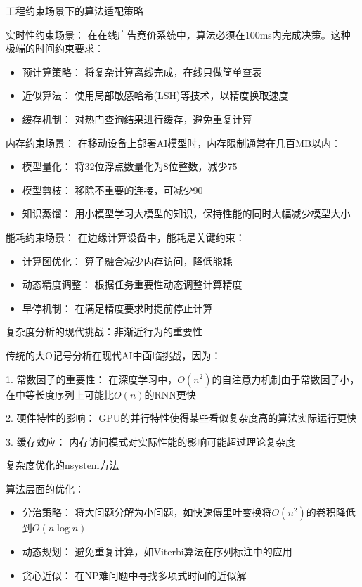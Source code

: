 工程约束场景下的算法适配策略

实时性约束场景：
在在线广告竞价系统中，算法必须在100ms内完成决策。这种极端的时间约束要求：

\begin{itemize}
\item 预计算策略： 将复杂计算离线完成，在线只做简单查表
\item 近似算法： 使用局部敏感哈希(LSH)等技术，以精度换取速度
\item 缓存机制： 对热门查询结果进行缓存，避免重复计算
\end{itemize}

内存约束场景：
在移动设备上部署AI模型时，内存限制通常在几百MB以内：

\begin{itemize}
\item 模型量化： 将32位浮点数量化为8位整数，减少75%
\item 模型剪枝： 移除不重要的连接，可减少90%
\item 知识蒸馏： 用小模型学习大模型的知识，保持性能的同时大幅减少模型大小
\end{itemize}

能耗约束场景：
在边缘计算设备中，能耗是关键约束：

\begin{itemize}
\item 计算图优化： 算子融合减少内存访问，降低能耗
\item 动态精度调整： 根据任务重要性动态调整计算精度
\item 早停机制： 在满足精度要求时提前停止计算
\end{itemize}

复杂度分析的现代挑战：非渐近行为的重要性

传统的大O记号分析在现代AI中面临挑战，因为：

1. 常数因子的重要性： 在深度学习中，$O(n^2)$的自注意力机制由于常数因子小，在中等长度序列上可能比$O(n)$的RNN更快

2. 硬件特性的影响： GPU的并行特性使得某些看似复杂度高的算法实际运行更快

3. 缓存效应： 内存访问模式对实际性能的影响可能超过理论复杂度

复杂度优化的nsystem方法

算法层面的优化：
\begin{itemize}
\item 分治策略： 将大问题分解为小问题，如快速傅里叶变换将$O(n^2)$的卷积降低到$O(n \log n)$
\item 动态规划： 避免重复计算，如Viterbi算法在序列标注中的应用
\item 贪心近似： 在NP难问题中寻找多项式时间的近似解
\end{itemize}

